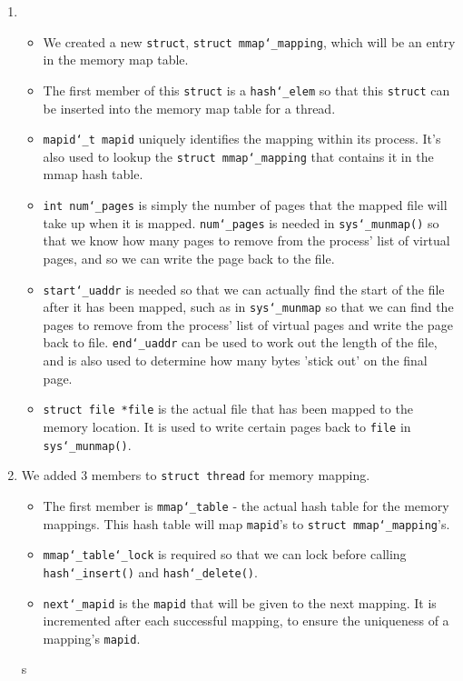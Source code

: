 \documentclass{article}
\renewcommand{\_}{\char`_}
\begin{document}
\begin{enumerate}

\item

\begin{itemize}
\item
We created a new \texttt{struct}, \texttt{struct mmap\_mapping}, which will be an entry in the memory map table. 
\item
The first member of this \texttt{struct} is a \texttt{hash\_elem} so that this \texttt{struct} can be inserted into the memory map table for a thread.
\item
\texttt{mapid\_t mapid} uniquely identifies the mapping within its process. It's also used to lookup the \texttt{struct mmap\_mapping} that contains it in the mmap hash table. 
\item
\texttt{int num\_pages} is simply the number of pages that the mapped file will take up when it is mapped. \texttt{num\_pages} is needed in \texttt{sys\_munmap()} so that we know how many pages to remove from the process' list of virtual pages, and so we can write the page back to the file. 
\item
\texttt{start\_uaddr} is needed so that we can actually find the start of the file after it has been mapped, such as in \texttt{sys\_munmap} so that we can find the pages to remove from the process' list of virtual pages and write the page back to file. \texttt{end\_uaddr} can be used to work out the length of the file, and is also used to determine how many bytes 'stick out' on the final page.
\item
\texttt{struct file *file} is the actual file that has been mapped to the memory location. It is used to write certain pages back to \texttt{file} in \texttt{sys\_munmap()}.

\end{itemize}

\item

We added 3 members to \texttt{struct thread} for memory mapping. 

\begin{itemize}
\item
The first member is \texttt{mmap\_table} - the actual hash table for the memory mappings. This hash table will map \texttt{mapid}'s to \texttt{struct mmap\_mapping}'s.
\item
\texttt{mmap\_table\_lock} is required so that we can lock before calling \texttt{hash\_insert()} and \texttt{hash\_delete()}.
\item
\texttt{next\_mapid} is the \texttt{mapid} that will be given to the next mapping. It is incremented after each successful mapping, to ensure the uniqueness of a mapping's \texttt{mapid}.
\end{itemize}
s
\end{enumerate}
\end{document}
